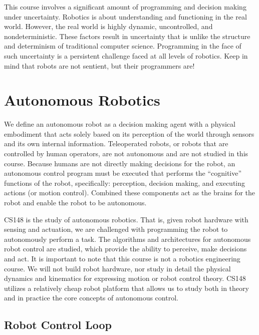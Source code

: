 This course involves a significant amount of programming and decision making under uncertainty. Robotics is about understanding and functioning in the real world. However, the real world is highly dynamic, uncontrolled, and nondeterministic. These factors result in uncertainty that is unlike the structure and determinism of traditional computer science. Programming in the face of such uncertainty is a persistent challenge faced at all levels of robotics. Keep in mind that robots are not sentient, but their programmers are!


\section{Autonomous Robotics}


We define an autonomous robot as a decision making agent with a physical embodiment that acts solely based on its perception of the world through sensors and its own internal information.  Teleoperated robots, or robots that are controlled by human operators, are not autonomous and are not studied in this course. Because humans are not directly making decisions for the robot, an autonomous control program must be executed that performs the ``cognitive'' functions of the robot, specifically: perception, decision making, and executing actions (or motion control). Combined these components act as the brains for the robot and enable the robot to be autonomous. 

CS148 is the study of autonomous robotics. That is, given robot hardware with sensing and actuation, we are challenged with programming the robot to autonomously perform a task. The algorithms and architectures for autonomous robot control are studied, which provide the ability to perceive, make decisions and act. It is important to note that this course is not a robotics engineering course. We will not build robot hardware, nor study in detail the physical dynamics and kinematics for expressing motion or robot control theory. CS148 utilizes a relatively cheap robot platform that allows us to study both in theory and in practice the core concepts of autonomous control.

\subsection{Robot Control Loop}


